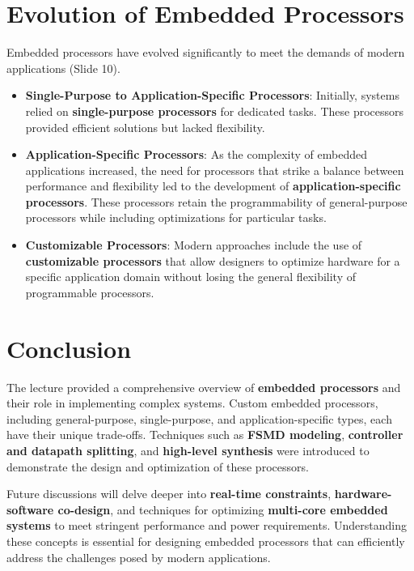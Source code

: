 \documentclass[
  14pt,
  a4paper,
  numbers=noendperiod,
  headinclude=true,
  footinclude=true,
  DIV=calc]{scrreprt}
\begin{document}
\section{Evolution of Embedded
Processors}\label{evolution-of-embedded-processors}

Embedded processors have evolved significantly to meet the demands of
modern applications (Slide 10).

\begin{itemize}
\item
  \textbf{Single-Purpose to Application-Specific Processors}: Initially,
  systems relied on \textbf{single-purpose processors} for dedicated
  tasks. These processors provided efficient solutions but lacked
  flexibility.
\item
  \textbf{Application-Specific Processors}: As the complexity of
  embedded applications increased, the need for processors that strike a
  balance between performance and flexibility led to the development of
  \textbf{application-specific processors}. These processors retain the
  programmability of general-purpose processors while including
  optimizations for particular tasks.
\item
  \textbf{Customizable Processors}: Modern approaches include the use of
  \textbf{customizable processors} that allow designers to optimize
  hardware for a specific application domain without losing the general
  flexibility of programmable processors.
\end{itemize}

\section{Conclusion}\label{conclusion-3}

The lecture provided a comprehensive overview of \textbf{embedded
processors} and their role in implementing complex systems. Custom
embedded processors, including general-purpose, single-purpose, and
application-specific types, each have their unique trade-offs.
Techniques such as \textbf{FSMD modeling}, \textbf{controller and
datapath splitting}, and \textbf{high-level synthesis} were introduced
to demonstrate the design and optimization of these processors.

Future discussions will delve deeper into \textbf{real-time
constraints}, \textbf{hardware-software co-design}, and techniques for
optimizing \textbf{multi-core embedded systems} to meet stringent
performance and power requirements. Understanding these concepts is
essential for designing embedded processors that can efficiently address
the challenges posed by modern applications.
\end{document}

